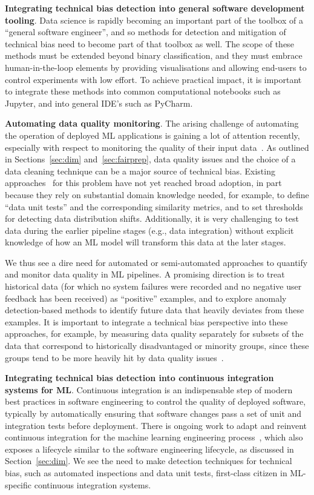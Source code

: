 \documentclass[11pt]{article}
\newcommand*{\eg}{e.g.,\xspace}
\newcommand{\header}[1]{\vspace{1mm}\noindent\textbf{#1}.}
\begin{document}
\header{Integrating technical bias detection into general software development tooling} Data science is rapidly becoming an important part of the toolbox of a ``general software engineer'', and so methods for detection and mitigation of technical bias need to become part of that toolbox as well. The scope of these methods must be extended beyond binary classification, and they must embrace human-in-the-loop elements by providing visualisations and allowing end-users to control experiments with low effort. To achieve practical impact, it is important to integrate these methods into common computational notebooks such as Jupyter, and into general IDE's such as PyCharm.

\header{Automating data quality monitoring} The arising challenge of automating the operation of deployed ML applications is gaining a lot of attention recently, especially with respect to monitoring the quality of their input data~\cite{rukattowards}. As outlined in Sections~\ref{sec:dim} and~\ref{sec:fairprep}, data quality issues and the choice of a data cleaning technique can be a major source of technical bias. Existing approaches~\cite{baylor2017tfx,schelter2018automating} for this problem have not yet reached broad adoption, in part because they rely on substantial domain knowledge needed, for example, to define ``data unit tests'' and the corresponding similarity metrics, and to set thresholds for detecting data distribution shifts. Additionally, it is very challenging to test data during the earlier pipeline stages (\eg  data integration) without explicit knowledge of how an ML model will  transform this data at the later stages. 

We thus see a dire need for automated or semi-automated approaches to quantify and monitor data quality in ML pipelines. A promising direction is to treat historical data (for which no system failures were recorded and no negative user feedback has been received) as ``positive'' examples, and to explore anomaly detection-based methods to identify future data that heavily deviates from these examples. It is important to integrate a technical bias perspective into these approaches, for example, by measuring data quality separately for subsets of the data that correspond to historically disadvantaged or minority groups, since these groups tend to be more heavily hit by data quality issues~\cite{chung2019slice}.

\header{Integrating technical bias detection into continuous integration systems for ML} Continuous integration is an indispensable step of modern best practices in software engineering to control the quality of deployed software, typically by automatically ensuring that software changes pass a set of unit and integration tests before deployment. There is  ongoing work to adapt and reinvent continuous integration for the machine learning engineering process~\cite{renggli2019continuous}, which also exposes a lifecycle similar to the software engineering lifecycle, as discussed in Section~\ref{sec:dim}. We see the need to make detection techniques for technical bias, such as automated inspections and data unit tests, first-class citizen in ML-specific continuous integration systems.
\end{document}
